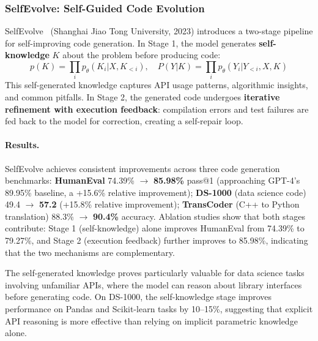 \subsubsection{SelfEvolve: Self-Guided Code Evolution}

SelfEvolve~\citep{selfevolve2023} (Shanghai Jiao Tong University, 2023) introduces a two-stage pipeline for self-improving code generation. In Stage 1, the model generates \textbf{self-knowledge} $K$ about the problem before producing code:
\begin{equation}
p(K) = \prod_i p_\theta(K_i | X, K_{<i}), \quad P(Y|K) = \prod_i p_\theta(Y_i | Y_{<i}, X, K)
\end{equation}
This self-generated knowledge captures API usage patterns, algorithmic insights, and common pitfalls. In Stage 2, the generated code undergoes \textbf{iterative refinement with execution feedback}: compilation errors and test failures are fed back to the model for correction, creating a self-repair loop.

\paragraph{Results.}
SelfEvolve achieves consistent improvements across three code generation benchmarks: \textbf{HumanEval} 74.39\% $\rightarrow$ \textbf{85.98\%} pass@1 (approaching GPT-4's 89.95\% baseline, a +15.6\% relative improvement); \textbf{DS-1000} (data science code) 49.4 $\rightarrow$ \textbf{57.2} (+15.8\% relative improvement); \textbf{TransCoder} (C++ to Python translation) 88.3\% $\rightarrow$ \textbf{90.4\%} accuracy. Ablation studies show that both stages contribute: Stage 1 (self-knowledge) alone improves HumanEval from 74.39\% to 79.27\%, and Stage 2 (execution feedback) further improves to 85.98\%, indicating that the two mechanisms are complementary.

The self-generated knowledge proves particularly valuable for data science tasks involving unfamiliar APIs, where the model can reason about library interfaces before generating code. On DS-1000, the self-knowledge stage improves performance on Pandas and Scikit-learn tasks by 10--15\%, suggesting that explicit API reasoning is more effective than relying on implicit parametric knowledge alone.

